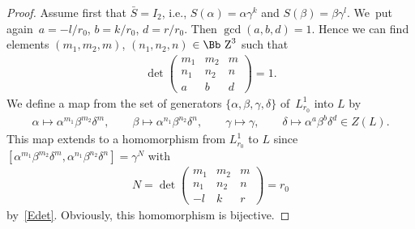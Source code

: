 \documentclass[pdftex]{sigma}
\newcommand\ZZ{{\mbox{\Bb Z}}}
\numberwithin{equation}{section}
\begin{document}
\begin{proof}
Assume first that $\bar S=I_2$, i.e., $S(\alpha)=\alpha\gamma^k$ and $S(\beta)=\beta\gamma^l$. We~put again~$a=-l/r_0$, $b=k/r_0$, $d=r/r_0$. Then $\gcd(a,b,d)=1$. Hence we can find elements $(m_1,m_2,m)$, $(n_1,n_2,n)$ $\in\ZZ^3$ such that
\begin{gather}\label{Edet}
\det \begin{pmatrix} m_1&m_2&m\\ n_1&n_2&n\\ a&b&d \end{pmatrix} =1.
\end{gather}
We define a map from the set of generators $\{\alpha,\beta,\gamma,\delta\}$ of~$L_{r_0}^1$ into $L$ by
\begin{gather*}
\alpha\longmapsto \alpha^{m_1}\beta^{m_2}\delta^m,\qquad
\beta\longmapsto \alpha^{n_1}\beta^{n_2}\delta^n,\qquad
\gamma\longmapsto\gamma,\qquad
\delta\longmapsto \alpha^a\beta^b\delta^d \in Z(L).
\end{gather*}
This map extends to a homomorphism from $L_{r_0}^1$ to $L$ since
$[\alpha^{m_1}\beta^{m_2}\delta^m,\alpha^{n_1}\beta^{n_2}\delta^n]=\gamma^N$ with
\begin{gather*}
N=\det\begin{pmatrix} m_1&m_2&m\\ n_1&n_2&n\\ -l&k&r \end{pmatrix} =r_0
\end{gather*}
by~\eqref{Edet}. Obviously, this homomorphism is bijective.


\end{proof}
\end{document}
